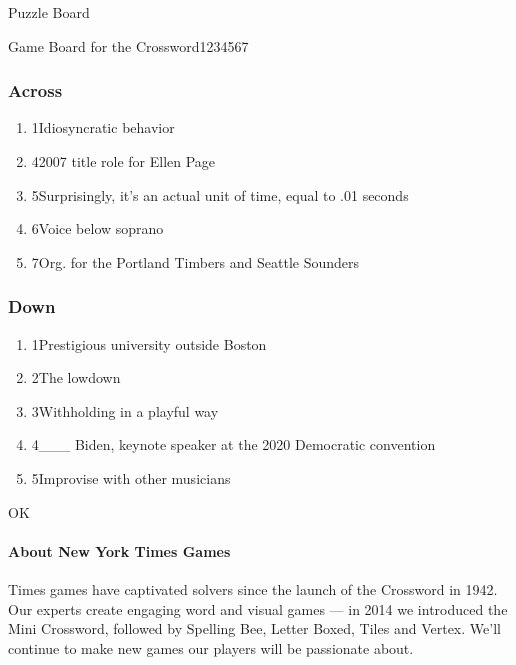 Puzzle Board

Game Board for the Crossword1234567

\hypertarget{across}{%
\subsubsection{Across}\label{across}}

\begin{enumerate}
\def\labelenumi{\arabic{enumi}.}
\tightlist
\item
  1Idiosyncratic behavior
\item
  42007 title role for Ellen Page
\item
  5Surprisingly, it's an actual unit of time, equal to .01 seconds
\item
  6Voice below soprano
\item
  7Org. for the Portland Timbers and Seattle Sounders
\end{enumerate}

\hypertarget{down}{%
\subsubsection{Down}\label{down}}

\begin{enumerate}
\def\labelenumi{\arabic{enumi}.}
\tightlist
\item
  1Prestigious university outside Boston
\item
  2The lowdown
\item
  3Withholding in a playful way
\item
  4\_\_\_ Biden, keynote speaker at the 2020 Democratic convention
\item
  5Improvise with other musicians
\end{enumerate}

OK

\hypertarget{about-new-york-times-games}{%
\paragraph{About New York Times
Games}\label{about-new-york-times-games}}

Times games have captivated solvers since the launch of the Crossword in
1942. Our experts create engaging word and visual games --- in 2014 we
introduced the Mini Crossword, followed by Spelling Bee, Letter Boxed,
Tiles and Vertex. We'll continue to make new games our players will be
passionate about.


